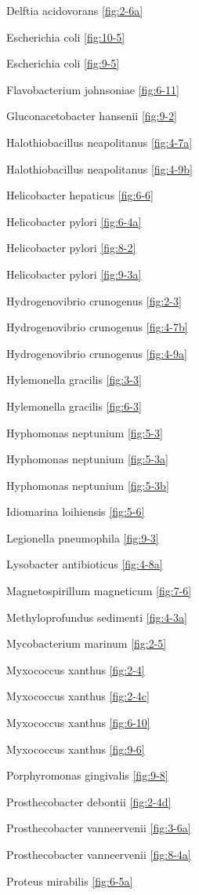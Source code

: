 \documentclass[]{tufte-book}
\begin{document}
Delftia acidovorans \ref{fig:2-6a}

Escherichia coli \ref{fig:10-5}

Escherichia coli \ref{fig:9-5}

Flavobacterium johnsoniae \ref{fig:6-11}

Gluconacetobacter hansenii \ref{fig:9-2}

Halothiobacillus neapolitanus \ref{fig:4-7a}

Halothiobacillus neapolitanus \ref{fig:4-9b}

Helicobacter hepaticus \ref{fig:6-6}

Helicobacter pylori \ref{fig:6-4a}

Helicobacter pylori \ref{fig:8-2}

Helicobacter pylori \ref{fig:9-3a}

Hydrogenovibrio crunogenus \ref{fig:2-3}

Hydrogenovibrio crunogenus \ref{fig:4-7b}

Hydrogenovibrio crunogenus \ref{fig:4-9a}

Hylemonella gracilis \ref{fig:3-3}

Hylemonella gracilis \ref{fig:6-3}

Hyphomonas neptunium \ref{fig:5-3}

Hyphomonas neptunium \ref{fig:5-3a}

Hyphomonas neptunium \ref{fig:5-3b}

Idiomarina loihiensis \ref{fig:5-6}

Legionella pneumophila \ref{fig:9-3}

Lysobacter antibioticus \ref{fig:4-8a}

Magnetospirillum magneticum \ref{fig:7-6}

Methyloprofundus sedimenti \ref{fig:4-3a}

Mycobacterium marinum \ref{fig:2-5}

Myxococcus xanthus \ref{fig:2-4}

Myxococcus xanthus \ref{fig:2-4c}

Myxococcus xanthus \ref{fig:6-10}

Myxococcus xanthus \ref{fig:9-6}

Porphyromonas gingivalis \ref{fig:9-8}

Prosthecobacter debontii \ref{fig:2-4d}

Prosthecobacter vanneervenii \ref{fig:3-6a}

Prosthecobacter vanneervenii \ref{fig:8-4a}

Proteus mirabilis \ref{fig:6-5a}
\end{document}
